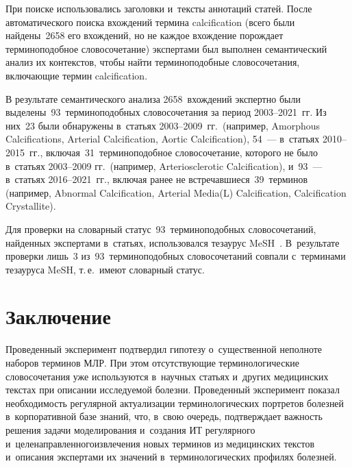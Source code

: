 \begin{multicols}{2}
  При поиске использовались заголовки и~текс\-ты аннотаций статей. После 
автоматического поиска вхождений термина calcification (всего были 
найде\-ны~2658 его вхождений, но не каждое вхождение порождает 
терминоподобное словосочетание) экспертами был выполнен семантический 
анализ их контекстов, чтобы найти терминоподобные словосочетания, 
включающие термин calcification.
  
  В результате семантического анализа 2658~вхож\-де\-ний экспертно были 
выделены~93~терминоподобных словосочетания за период 2003--2021~гг. Из 
них~23 были обнаружены в~статьях 2003--2009~гг.\ (например, Amorphous 
Calcifications, Arterial Calcification, Aortic Calcification), 54~--- в~статьях  
2010--2015~гг., включая~31~терминоподобное словосочетание, которого не 
было в~стать\-ях 2003--2009 гг.\ (например, Arteriosclerotic Calcification),  
и~93~--- в~стать\-ях 2016--2021~гг., включая ранее не 
встре\-чав\-ши\-еся~39~терминов (например, Abnormal Calcification, Arterial 
Media(L) Calcification, Calcification Crystallite).
  
  Для проверки на словарный статус~93~терминоподобных словосочетаний, 
найденных экспертами в~статьях, использовался тезаурус MeSH~\cite{1-zz}. 
В~результате проверки лишь~3 из~93~терминоподобных словосочетаний 
совпали с~терминами тезауруса MeSH, т.\,е.\ имеют словарный статус.

\section{Заключение}

  Проведенный эксперимент подтвердил гипотезу о~существенной 
неполноте наборов терминов МЛР. При этом отсутствующие 
терминологические словосочетания уже используются в~научных стать\-ях 
и~других медицинских текстах при описании исследуемой болезни. 
Проведенный эксперимент показал необходимость регулярной актуализации\linebreak 
терминологических портретов болезней в~корпоративной базе знаний, что, 
в~свою очередь, под\-тверж\-да\-ет важ\-ность решения задачи моделирования 
и~создания ИТ регулярного и~\mbox{целенаправленного}\linebreak извлечения новых 
терминов из медицинских текс\-тов и~описания экспертами их значений 
в~терминологических профилях болезней.
  

\end{multicols}
